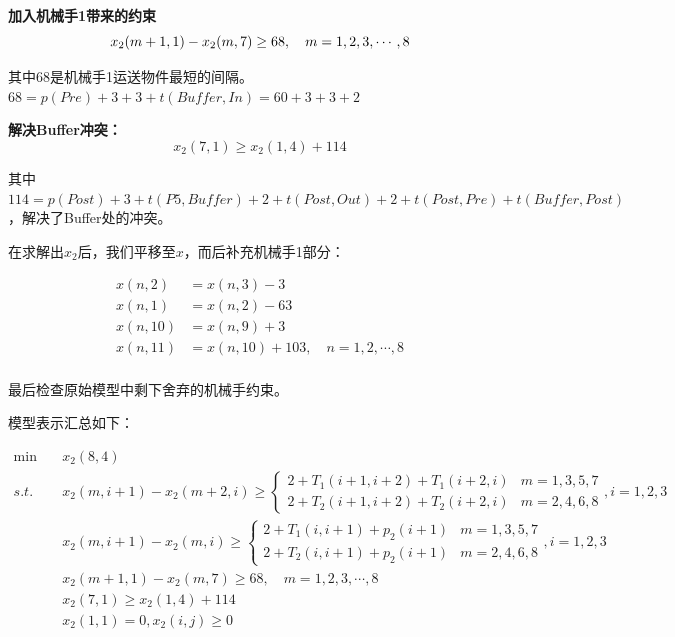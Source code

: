 \documentclass{ctexart}
\begin{document}
{{{        \vspace{10pt}
        
        \textbf{加入机械手1带来的约束}
        $$
        x_2(m+1,1) - x_2(m,7) \ge 68, \quad m=1,2,3,\cdots,8 \\
        $$
        
        其中68是机械手1运送物件最短的间隔。$68=p(Pre)+3+3+t(Buffer,In)=60+3+3+2$
        
        \vspace{10pt}
        
        \textbf{解决Buffer冲突：}
        $$
        x_2(7,1) \ge x_2(1,4)+114
        $$
        
        其中$114=p(Post)+3+t(P5,Buffer)+2+t(Post,Out)+2+t(Post,Pre)+t(Buffer,Post)$，解决了Buffer处的冲突。
        }
    
    	在求解出$x_2$后，我们平移至$x$，而后补充机械手1部分：
    	
    	$$
    	\begin{aligned}
    	x(n,2)&=x(n,3)-3 \\
    	x(n,1)&=x(n,2)-63 \\
    	x(n,10)&=x(n,9)+3 \\
    	x(n,11)&=x(n,10)+103,\quad n=1,2,\cdots,8 \\
    	\end{aligned}
    	$$
    	
    	最后检查原始模型中剩下舍弃的机械手约束。
    
    	模型表示汇总如下：
    	
		$$
		\begin{aligned}
		\min \quad &x_2(8,4) \\
		s.t. \quad &x_2(m,i+1)-x_2(m+2,i) \ge \begin{cases}
		2+T_1(i+1,i+2)+T_1(i+2,i) &m=1,3,5,7\\
		2+T_2(i+1,i+2)+T_2(i+2,i) &m=2,4,6,8
		\end{cases}, i=1,2,3 \\
		\quad &x_2(m,i+1) - x_2(m,i) \ge  \begin{cases}
		2+T_1(i,i+1)+p_2(i+1) &m=1,3,5,7\\
		2+T_2(i,i+1)+p_2(i+1) &m=2,4,6,8
		\end{cases}, i=1,2,3 \\
		\quad &x_2(m+1,1) - x_2(m,7) \ge 68, \quad m=1,2,3,\cdots,8 \\
		\quad &x_2(7,1) \ge x_2(1,4)+114 \\
		\quad &x_2(1,1)=0, x_2(i,j) \ge 0 \\
		\end{aligned}
		$$
		
}}
\end{document}
